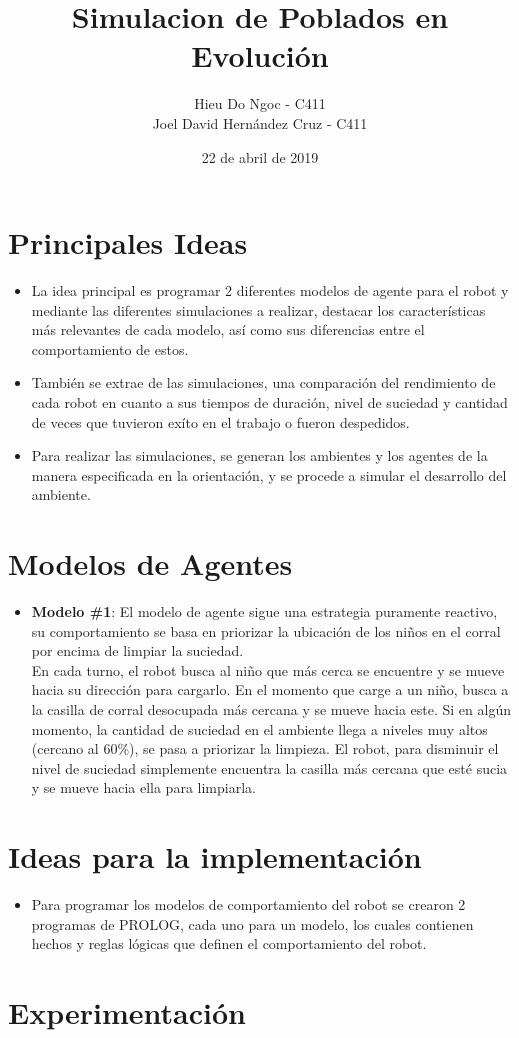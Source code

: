 \documentclass[12pt]{article}
\title{Simulacion de Poblados en Evoluci\'on}
\author{Hieu Do Ngoc - C411 \\ Joel David Hern\'andez Cruz - C411}
\date{22 de abril de 2019}
\begin{document}
\maketitle
\newpage

\section{Principales Ideas} 
\begin{itemize}
	\item La idea principal es programar 2 diferentes modelos de agente 
	para el robot y mediante las diferentes simulaciones a realizar, destacar
	los caracter\'isticas m\'as relevantes de cada modelo, as\'i como 
	sus diferencias entre el comportamiento de estos.
	\item Tambi\'en se extrae de las simulaciones, una comparaci\'on del 
	rendimiento de	cada robot en cuanto a sus tiempos de duraci\'on, nivel 
	de	suciedad y cantidad de veces que tuvieron ex\'ito en el trabajo o fueron
	despedidos.
	\item Para realizar las simulaciones, se generan los ambientes y los agentes
	de la manera especificada en la orientaci\'on, y se procede a simular el
	desarrollo del ambiente.	
\end{itemize}

\section{Modelos de Agentes}
\begin{itemize}
	\item \textbf{Modelo \#1}:
	El modelo de agente sigue una estrategia puramente reactivo, 
	su comportamiento se basa en priorizar la ubicaci\'on de los ni\~nos en el 
	corral por encima de limpiar la suciedad.\\
	En cada turno, el robot busca al ni\~no que m\'as cerca se encuentre 
	y se mueve hacia su direcci\'on para cargarlo. En el momento que carge
	a un ni\~no, busca a la casilla de corral desocupada m\'as cercana y 
	se mueve hacia este. Si en alg\'un momento, la cantidad de suciedad en el ambiente llega a 
	niveles muy altos (cercano al 60\%), se pasa a priorizar la limpieza.
	El robot, para disminuir el nivel de suciedad simplemente encuentra la 
	casilla m\'as cercana que est\'e sucia y se mueve hacia ella para limpiarla.
\end{itemize}

\section{Ideas para la implementaci\'on}
\begin{itemize}
	\item Para programar los modelos de comportamiento del robot se crearon
	2 programas de PROLOG, cada uno para un modelo, los cuales contienen 
	hechos y reglas l\'ogicas que definen el comportamiento del robot.
\end{itemize}
\section{Experimentaci\'on}
\end{document}
